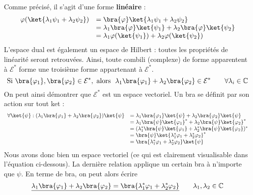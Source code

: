 Comme précisé, il s'agit d'une forme \textbf{linéaire} :
\begin{equation}
\begin{array}{ll}
\varphi(\ket{\lambda_1\psi_1+\lambda_2\psi_2}) &= \bra{\varphi}\ket{\lambda_1\psi_1+\lambda_2\psi_2}\\
&= \lambda_1\bra{\varphi}\ket{\psi_1}+\lambda_2\bra{\varphi}\ket{\psi_2}\\
&= \lambda_1\varphi(\ket{\psi_1})+\lambda_2\varphi(\ket{\psi_2})
\end{array}
\end{equation}
L'espace dual est également un espace de Hilbert : toutes les propriétés de 
linéarité seront retrouvées. Ainsi, toute combili (complexe) de forme 
apparentent à $\mathcal{E}^*$ forme une troisième forme appartenant à 
$\mathcal{E}^*$.
\begin{equation}
\text{Si } \bra{\varphi_1},\bra{\varphi_2}\in\mathcal{E}^*, \text{ alors }\ 
\lambda_1\bra{\varphi_1} + \lambda_2\bra{\varphi_2} \in\mathcal{E}^*\qquad 
\forall \lambda_i\in\mathbb{C}
\end{equation}
On peut ainsi démontrer que $\mathcal{E}^*$ est un espace vectoriel.
Un bra se définit par son action sur tout ket :
\begin{equation}
\begin{array}{ll}
\forall \ket{\psi} : (\lambda_1\bra{\varphi_1} + \lambda_2\bra{\varphi_2})\ket{\psi} 
&= \lambda_1\bra{\varphi_1}\ket{\psi}+\lambda_2\bra{\varphi_2}\ket{\psi} \\
&= \lambda_1\bra{\psi}\ket{\varphi_1}^*+\lambda_2\bra{\psi}\ket{\varphi_2}^*\\
&= (\lambda_1^*\bra{\psi}\ket{\varphi_1}+\lambda_2^*\bra{\psi}\ket{\varphi_2})^*\\
&= \bra{\psi}\ket{\lambda_1^*\varphi_1+\lambda_2^*\varphi_2}^*\\
&= \bra{\lambda_1^*\varphi_1+\lambda_2^*\varphi_2}\ket{\psi}
\end{array}
\end{equation}
Nous avons donc bien un espace vectoriel (ce qui est clairement visualisable 
dans l'équation ci-dessous). La dernière relation applique un certain bra à 
n'importe que $\psi$. En terme de bra, on peut alors écrire
\begin{equation}
\underline{\lambda_1\bra{\varphi_1} + \lambda_2\bra{\varphi_2} = \bra{\lambda_1^*\varphi_1
+\lambda_2^*\varphi_2}}\qquad \lambda_1,\lambda_2\in\mathbb{C}
\end{equation}


